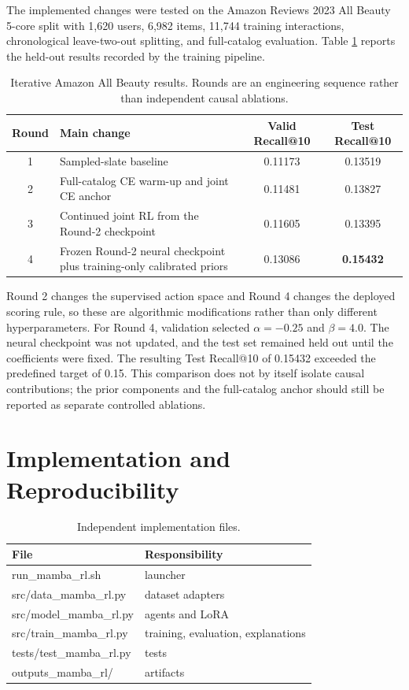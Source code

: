 \documentclass[11pt,a4paper]{article}
\begin{document}
The implemented changes were tested on the Amazon Reviews 2023 All Beauty
5-core split with 1,620 users, 6,982 items, 11,744 training interactions,
chronological leave-two-out splitting, and full-catalog evaluation. Table
\ref{tab:amazon-iterations} reports the held-out results recorded by the
training pipeline.

\begin{table}[H]
\centering
\caption{Iterative Amazon All Beauty results. Rounds are an engineering
sequence rather than independent causal ablations.}
\label{tab:amazon-iterations}
\begin{tabularx}{\textwidth}{cXcc}
\toprule
Round & Main change & Valid Recall@10 & Test Recall@10\\
\midrule
1 & Sampled-slate baseline & 0.11173 & 0.13519\\
2 & Full-catalog CE warm-up and joint CE anchor & 0.11481 & 0.13827\\
3 & Continued joint RL from the Round-2 checkpoint & 0.11605 & 0.13395\\
4 & Frozen Round-2 neural checkpoint plus training-only calibrated priors &
0.13086 & \textbf{0.15432}\\
\bottomrule
\end{tabularx}
\end{table}

Round 2 changes the supervised action space and Round 4 changes the deployed
scoring rule, so these are algorithmic modifications rather than only different
hyperparameters. For Round 4, validation selected $\alpha=-0.25$ and
$\beta=4.0$. The neural checkpoint was not updated, and the test set remained
held out until the coefficients were fixed. The resulting Test Recall@10 of
0.15432 exceeded the predefined target of 0.15. This comparison does not by
itself isolate causal contributions; the prior components and the full-catalog
anchor should still be reported as separate controlled ablations.

\section{Implementation and Reproducibility}

\begin{table}[H]
\centering
\caption{Independent implementation files.}
\begin{tabularx}{\textwidth}{>{\ttfamily}p{}X}
\toprule
File & Responsibility\\
\midrule
run\_mamba\_rl.sh & launcher\\
src/data\_mamba\_rl.py & dataset adapters\\
src/model\_mamba\_rl.py & agents and LoRA\\
src/train\_mamba\_rl.py & training, evaluation, explanations\\
tests/test\_mamba\_rl.py & tests\\
outputs\_mamba\_rl/ & artifacts\\
\bottomrule
\end{tabularx}
\end{table}
\end{document}
